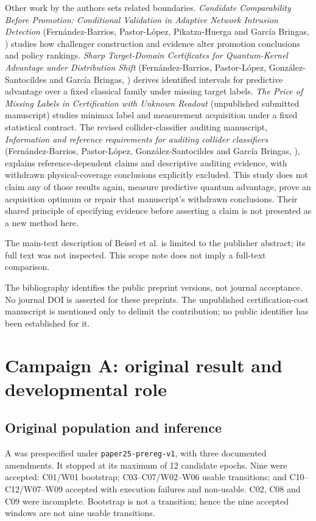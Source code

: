 \documentclass[11pt,a4paper]{article}
\begin{document}
Other work by the authors sets related boundaries. \emph{Candidate Comparability Before Promotion: Conditional Validation in Adaptive Network Intrusion Detection} (Fernández-Barrios, Pastor-López, Pikatza-Huerga and García Bringas, \cite{fernandez2026candidate}) studies how challenger construction and evidence alter promotion conclusions and policy rankings. \emph{Sharp Target-Domain Certificates for Quantum-Kernel Advantage under Distribution Shift} (Fernández-Barrios, Pastor-López, González-Santocildes and García Bringas, \cite{fernandez2026certificates}) derives identified intervals for predictive advantage over a fixed classical family under missing target labels. \emph{The Price of Missing Labels in Certification with Unknown Readout} (unpublished submitted manuscript) studies minimax label and measurement acquisition under a fixed statistical contract. The revised collider-classifier auditing manuscript, \emph{Information and reference requirements for auditing collider classifiers} (Fernández-Barrios, Pastor-López, González-Santocildes and García Bringas, \cite{fernandez2026collider}), explains reference-dependent claims and descriptive auditing evidence, with withdrawn physical-coverage conclusions explicitly excluded. This study does not claim any of those results again, measure predictive quantum advantage, prove an acquisition optimum or repair that manuscript's withdrawn conclusions. Their shared principle of specifying evidence before asserting a claim is not presented as a new method here.

The main-text description of Beisel et al. is limited to the publisher abstract; its full text was not inspected. This scope note does not imply a full-text comparison.

The bibliography identifies the public preprint versions, not journal acceptance. No journal DOI is asserted for these preprints. The unpublished certification-cost manuscript is mentioned only to delimit the contribution; no public identifier has been established for it.

\section{Campaign A: original result and developmental role}
\subsection{Original population and inference}
A was prespecified under \texttt{paper25-prereg-v1}, with three documented amendments. It stopped at its maximum of 12 candidate epochs. Nine were accepted: C01/W01 bootstrap; C03--C07/W02--W06 usable transitions; and C10--C12/W07--W09 accepted with execution failures and non-usable. C02, C08 and C09 were incomplete. Bootstrap is not a transition; hence the nine accepted windows are not nine usable transitions.
\end{document}
